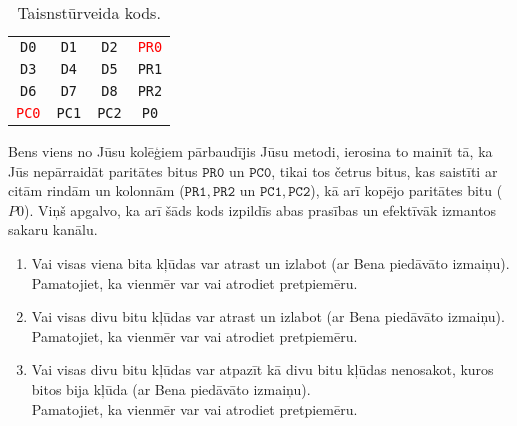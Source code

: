 \documentclass[a4paper,12pt]{article}
\begin{document}
\begin{table}[h]
\begin{center}
\begin{tabular}{cccc}
{\tt D0} & {\tt D1} & {\tt D2} & \textcolor{red}{\tt PR0} \\
{\tt D3} & {\tt D4} & {\tt D5} & {\tt PR1} \\
{\tt D6} & {\tt D7} & {\tt D8} & {\tt PR2} \\
\textcolor{red}{\tt PC0} & {\tt PC1} & {\tt PC2} & {\tt P0} \\
\end{tabular}
\caption{\label{tab:rectangular} Taisnstūrveida kods.}
\end{center}
\end{table}

Bens \textendash{} viens no Jūsu kolēģiem \textendash{} pārbaudījis Jūsu
metodi, ierosina to mainīt tā, ka Jūs nepārraidāt paritātes bitus
$\mathtt{PR0}$ un $\mathtt{PC0}$, tikai tos četrus bitus, kas
saistīti ar citām rindām un kolonnām 
($\mathtt{PR1},\mathtt{PR2}$ un $\mathtt{PC1},\mathtt{PC2}$), 
kā arī kopējo paritātes bitu ($P0$).
Viņš apgalvo, ka arī šāds kods izpildīs abas prasības 
un efektīvāk izmantos sakaru kanālu.
\begin{enumerate}[label=(\alph*)]
\item Vai visas viena bita kļūdas var atrast un izlabot (ar Bena piedāvāto izmaiņu).\\ 
Pamatojiet, ka vienmēr var vai atrodiet pretpiemēru. 
\item Vai visas divu bitu kļūdas var atrast un izlabot (ar Bena piedāvāto izmaiņu).\\
Pamatojiet, ka vienmēr var vai atrodiet pretpiemēru. 
\item Vai visas divu bitu kļūdas var atpazīt kā divu bitu kļūdas \textendash{} 
nenosakot, kuros bitos bija kļūda (ar Bena piedāvāto izmaiņu).\\
Pamatojiet, ka vienmēr var vai atrodiet pretpiemēru. 
\end{enumerate}
\end{document}
